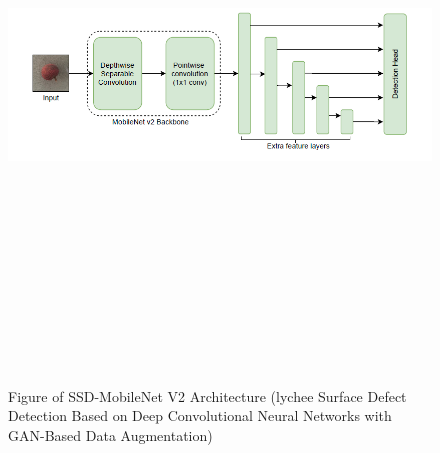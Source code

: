  \begin{figure}[H]
    \centering
    \includegraphics[width=1\textwidth,height=15cm,keepaspectratio]{Images/SSD-MobileNet V2 Architecture.PNG}\\
    \caption{Figure of SSD-MobileNet V2 Architecture (lychee Surface Defect Detection Based on Deep Convolutional Neural Networks with GAN-Based Data Augmentation)\cite{litReviewLychee}}
    \label{fig:Figure of SSD-MobileNet V2 Architecture for lychee Classification Model (lychee Surface Defect Detection Based on Deep Convolutional Neural Networks with GAN-Based Data Augmentation)}
\end{figure}
\vspace{0.5mm}
